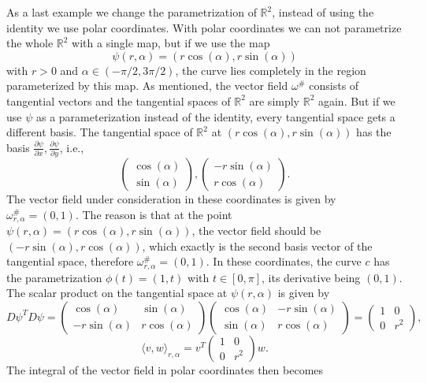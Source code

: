 As a last example we change the parametrization of $\mathbb R^2$, instead of using the identity we use polar coordinates. With polar coordinates we can not parametrize the whole $\mathbb R^2$ with a single map, but if we use the map 
\[\psi(r,\alpha) = (r \cos(\alpha), r \sin(\alpha))\]
with $r>0$ and $\alpha \in (-\pi/2,3\pi/2)$, the curve lies completely in the region parameterized by this map. As mentioned, the vector field $\omega^\#$ consists of tangential vectors and the tangential spaces of $\mathbb R^2$ are simply $\mathbb R^2$ again. But if we use $\psi$ as a parameterization instead of the identity, every tangential space gets a different basis. The tangential space of $\mathbb R^2$ at $(r \cos(\alpha), r \sin(\alpha))$ has the basis $\frac{\partial \psi}{\partial x},\frac{\partial \psi}{\partial y}$, i.e.,
\[\begin{pmatrix}
\cos(\alpha) \\
\sin (\alpha)
\end{pmatrix}, \begin{pmatrix}
	-r\sin(\alpha) \\
	r \cos(\alpha)
\end{pmatrix}.\]
The vector field under consideration in these coordinates is given by $\omega^\#_{r,\alpha} = (0,1)$. The reason is that at the point $\psi(r,\alpha) = (r \cos(\alpha), r \sin(\alpha))$, the vector field should be $(-r \sin(\alpha), r \cos(\alpha))$, which exactly is the second basis vector of the tangential space, therefore $\omega^\#_{r,\alpha} = (0,1)$. In these coordinates, the curve $c$ has the parametrization $\phi(t) = (1,t)$ with $t \in [0, \pi]$, its derivative being $(0,1)$. The scalar product on the tangential space at $\psi(r,\alpha)$ is given by
\[D\psi^T D\psi = \begin{pmatrix}
\cos(\alpha) & \sin (\alpha)
\\
	-r\sin(\alpha) &	r \cos(\alpha)
\end{pmatrix}\begin{pmatrix}
\cos(\alpha) & -r\sin (\alpha)
\\
	\sin(\alpha) &	r \cos(\alpha)
\end{pmatrix} = \begin{pmatrix}
	1 & 0 \\
	0 & r^2
\end{pmatrix},\]
\[\langle v,w\rangle_{r,\alpha} = v^T \begin{pmatrix}
	1 & 0 \\
	0 & r^2
\end{pmatrix} w.\]
The integral of the vector field in polar coordinates then becomes
